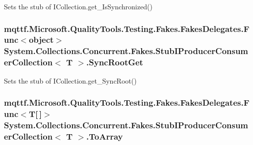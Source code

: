 Sets the stub of I\-Collection.\-get\-\_\-\-Is\-Synchronized()

\hypertarget{class_system_1_1_collections_1_1_concurrent_1_1_fakes_1_1_stub_i_producer_consumer_collection_3_01_t_01_4_af01273aa6b7d366edfa114213ba95cd1}{
\subsubsection[{Sync\-Root\-Get}]{\setlength{\rightskip}{0pt plus 5cm}mqttf.\-Microsoft.\-Quality\-Tools.\-Testing.\-Fakes.\-Fakes\-Delegates.\-Func$<$object$>$ System.\-Collections.\-Concurrent.\-Fakes.\-Stub\-I\-Producer\-Consumer\-Collection$<$ T $>$.Sync\-Root\-Get}}\label{class_system_1_1_collections_1_1_concurrent_1_1_fakes_1_1_stub_i_producer_consumer_collection_3_01_t_01_4_af01273aa6b7d366edfa114213ba95cd1}


Sets the stub of I\-Collection.\-get\-\_\-\-Sync\-Root()

\hypertarget{class_system_1_1_collections_1_1_concurrent_1_1_fakes_1_1_stub_i_producer_consumer_collection_3_01_t_01_4_afca1d5248c07dad85073a595432b91a7}{
\subsubsection[{To\-Array}]{\setlength{\rightskip}{0pt plus 5cm}mqttf.\-Microsoft.\-Quality\-Tools.\-Testing.\-Fakes.\-Fakes\-Delegates.\-Func$<$T\mbox{[}$\,$\mbox{]}$>$ System.\-Collections.\-Concurrent.\-Fakes.\-Stub\-I\-Producer\-Consumer\-Collection$<$ T $>$.To\-Array}}\label{class_system_1_1_collections_1_1_concurrent_1_1_fakes_1_1_stub_i_producer_consumer_collection_3_01_t_01_4_afca1d5248c07dad85073a595432b91a7}


